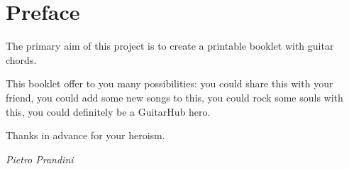 \section*{Preface}
The primary aim of this project is to create a printable booklet with guitar chords.\par
This booklet offer to you many possibilities: you could share this with your friend, you could add some new songs to this,
you could rock some souls with this, you could definitely be a GuitarHub hero.\par
Thanks in advance for your heroism.\par
\begin{flushright}
	{\textit{\rmfamily Pietro Prandini}}\par
\end{flushright}
\newpage
